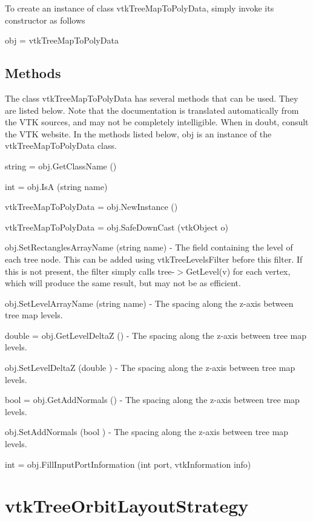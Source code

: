 To create an instance of class vtk\-Tree\-Map\-To\-Poly\-Data, simply invoke its constructor as follows \begin{DoxyVerb}  obj = vtkTreeMapToPolyData
\end{DoxyVerb}
 \hypertarget{vtkwidgets_vtkxyplotwidget_Methods}{}\subsection{Methods}\label{vtkwidgets_vtkxyplotwidget_Methods}
The class vtk\-Tree\-Map\-To\-Poly\-Data has several methods that can be used. They are listed below. Note that the documentation is translated automatically from the V\-T\-K sources, and may not be completely intelligible. When in doubt, consult the V\-T\-K website. In the methods listed below, {\ttfamily obj} is an instance of the vtk\-Tree\-Map\-To\-Poly\-Data class. 
\begin{DoxyItemize}
\item {\ttfamily string = obj.\-Get\-Class\-Name ()}  
\item {\ttfamily int = obj.\-Is\-A (string name)}  
\item {\ttfamily vtk\-Tree\-Map\-To\-Poly\-Data = obj.\-New\-Instance ()}  
\item {\ttfamily vtk\-Tree\-Map\-To\-Poly\-Data = obj.\-Safe\-Down\-Cast (vtk\-Object o)}  
\item {\ttfamily obj.\-Set\-Rectangles\-Array\-Name (string name)} -\/ The field containing the level of each tree node. This can be added using vtk\-Tree\-Levels\-Filter before this filter. If this is not present, the filter simply calls tree-\/$>$Get\-Level(v) for each vertex, which will produce the same result, but may not be as efficient.  
\item {\ttfamily obj.\-Set\-Level\-Array\-Name (string name)} -\/ The spacing along the z-\/axis between tree map levels.  
\item {\ttfamily double = obj.\-Get\-Level\-Delta\-Z ()} -\/ The spacing along the z-\/axis between tree map levels.  
\item {\ttfamily obj.\-Set\-Level\-Delta\-Z (double )} -\/ The spacing along the z-\/axis between tree map levels.  
\item {\ttfamily bool = obj.\-Get\-Add\-Normals ()} -\/ The spacing along the z-\/axis between tree map levels.  
\item {\ttfamily obj.\-Set\-Add\-Normals (bool )} -\/ The spacing along the z-\/axis between tree map levels.  
\item {\ttfamily int = obj.\-Fill\-Input\-Port\-Information (int port, vtk\-Information info)}  
\end{DoxyItemize}\hypertarget{vtkinfovis_vtktreeorbitlayoutstrategy}{}\section{vtk\-Tree\-Orbit\-Layout\-Strategy}\label{vtkinfovis_vtktreeorbitlayoutstrategy}
